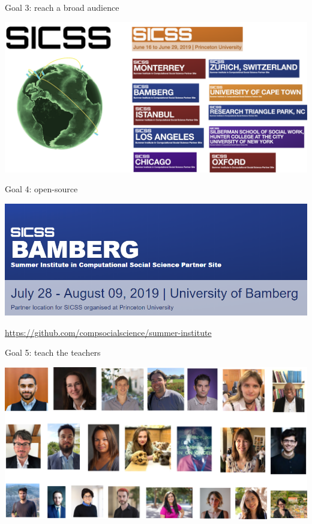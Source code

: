 \documentclass{beamer}
\def\vf{\vfill}
\begin{document}
\begin{frame}{Goal 3: reach a broad audience}

\begin{center}
\includegraphics[width=1.0\textwidth]{figures/sicss_world.png}
\end{center}

\end{frame}

\begin{frame}{Goal 4: open-source}

\begin{center}
\includegraphics[width=1.0\textwidth]{figures/sicss_bamberg.png}
\end{center}

\vf
\tiny{\url{https://github.com/compsocialscience/summer-institute}}
\end{frame}

\begin{frame}{Goal 5: teach the teachers}

\begin{center}
\includegraphics[width=1.0\textwidth]{figures/alumni_leaders.png}
\end{center}

\end{frame}
\end{document}
